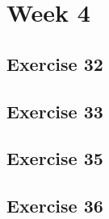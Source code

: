 \documentclass[a4paper]{article}
\let\stdsection\section
\renewcommand\section{\newpage\stdsection}
\begin{document}
\section*{Week 4}


\subsection*{Exercise 32}


\newpage
\subsection*{Exercise 33}






%
%
%
%

\newpage
\subsection*{Exercise 35}

\newpage
\subsection*{Exercise 36}






\end{document}
